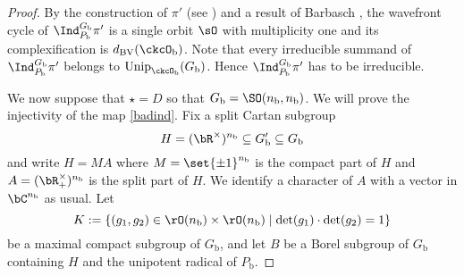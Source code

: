 \documentclass[12pt,a4paper]{amsart}
\newcommand{\trivial}[2][]{\if\relax\detokenize{#1}\relax
  {%
      \color{orange} \vspace{0em} $[$  #2 $]$
      \color{black}
  }
  \else
\ifx#1h
\ifcsname showtrivial\endcsname
{%
    \color{orange} \vspace{0em}  $[$ #2 $]$
    \color{black}
}
\fi
\else {\red Wrong argument!} \fi
\fi
}
\newcommand{\WF}{\mathrm{WF}}
\newcommand{\AV}{\mathrm{AV}}
\DeclareMathOperator{\Ann}{Ann}
\numberwithin{equation}{section}
\theoremstyle{remark}
\def\half{{\tfrac{1}{2}}}
\def\Unip{\mathrm{Unip}}
\def\dBV{d_{\mathrm{BV}}}
\def\lamck{\lambda_\ckcO}
\def\ckcOb{\ckcO_{\mathrm b}}
\def\nnb{n_{\mathrm b}}
\def\Gb{G_{\mathrm b}}
\def\Gpb{G'_{\mathrm b}}
\def\Pb{P_{\mathrm b}}
\newcommand{\Grt}{\cK}
\begin{document}
\begin{proof}

  By the construction of $\pi'$  (see ) and
  a result of Barbasch \cite[Corollary 5.0.10]{B.Orbit}, the
  wavefront cycle of $\Ind_{\Pb}^{\Gb}\pi'$ is a single orbit $\sO$ with
  multiplicity one and its complexification is $\dBV(\ckcOb)$.
  Note that every irreducible summand of  $\Ind_{\Pb}^{\Gb}\pi'$ belongs
  to $\Unip_{\ckcOb}(\Gb)$. Hence $\Ind_{\Pb}^{\Gb}\pi'$ has to be irreducible.




  We now suppose that $\star=D$ so that $\Gb=\SO(\nnb, \nnb)$. We will prove the injectivity of the map \eqref{badind}.
    Fix a split Cartan subgroup
    $$H=(\bR^\times)^{\nnb}\subseteq \Gpb\subseteq \Gb $$ and write $H = MA$ where
    $M = \set{\pm 1}^{\nnb}$ is the compact part of $H$ and
    $A = (\bR^\times_+)^{\nnb}$ is the split part of $H$. We identify a
    character of $A$ with a vector in $\bC^{\nnb}$ as usual. Let
    \[
    K:=\{(g_1, g_2)\in \rO(\nnb)\times \rO(\nnb)\mid \det(g_1)\cdot \det(g_2)=1\}
    \]
    be a maximal compact subgroup of $\Gb$, and let
    $B$ be a Borel subgroup of $\Gb$ containing $H$ and the unipotent radical of $\Pb$.


\end{proof}
\end{document}
